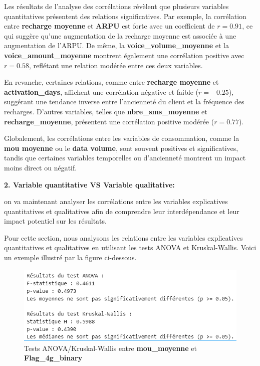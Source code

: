 Les résultats de l'analyse des corrélations révèlent que plusieurs variables quantitatives présentent des relations significatives. Par exemple, la corrélation entre \textbf{recharge moyenne} et \textbf{ARPU} est forte avec un coefficient de \(r = 0.91\), ce qui suggère qu'une augmentation de la recharge moyenne est associée à une augmentation de l'ARPU. De même, la \textbf{voice\_volume\_moyenne} et la \textbf{voice\_amount\_moyenne} montrent également une corrélation positive avec \(r = 0.58\), reflétant une relation modérée entre ces deux variables.

En revanche, certaines relations, comme entre \textbf{recharge moyenne} et \textbf{activation\_days}, affichent une corrélation négative et faible (\(r = -0.25\)), suggérant une tendance inverse entre l'ancienneté du client et la fréquence des recharges. D'autres variables, telles que \textbf{nbre\_sms\_moyenne} et \textbf{recharge\_moyenne}, présentent une corrélation positive modérée (\(r = 0.77\)).

Globalement, les corrélations entre les variables de consommation, comme la \textbf{mou moyenne} ou le \textbf{data volume}, sont souvent positives et significatives, tandis que certaines variables temporelles ou d'ancienneté montrent un impact moins direct ou négatif.

\textbf{2. Variable quantitative VS Variable qualitative:}

on va maintenant analyser les corrélations entre les variables explicatives quantitatives et qualitatives afin de comprendre leur interdépendance et leur impact potentiel sur les résultats.

Pour cette section, nous analysons les relations entre les variables explicatives quantitatives et qualitatives en utilisant les tests ANOVA et Kruskal-Wallis. Voici un exemple illustré par la figure ci-dessous.

\begin{figure}[H]
    \centering
    \includegraphics[width=0.7\linewidth]{capture_sas_36.png}
    \caption{Tests ANOVA/Kruskal-Wallis entre \textbf{mou\_moyenne} et \textbf{Flag\_4g\_binary}}
    \label{flag4g_mou}
\end{figure}

